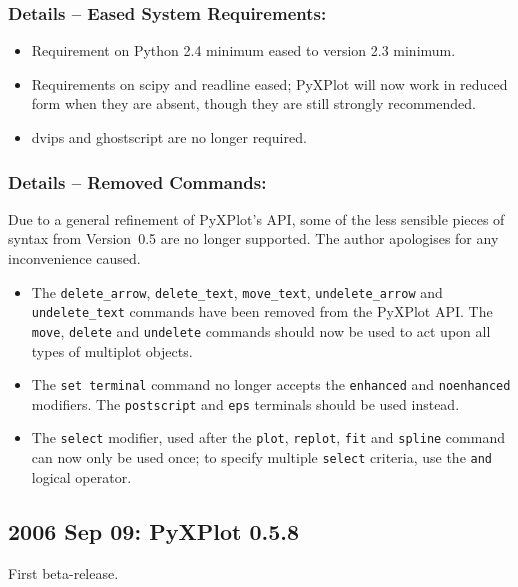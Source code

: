 \subsubsection*{Details -- Eased System Requirements:}

\begin{itemize}
\item Requirement on Python 2.4 minimum eased to version 2.3 minimum.
\item Requirements on scipy and readline eased; PyXPlot will now work in reduced form when they are absent, though they are still strongly recommended.
\item dvips and ghostscript are no longer required.
\end{itemize}

\subsubsection*{Details -- Removed Commands:}

Due to a general refinement of PyXPlot's API, some of the less sensible pieces
of syntax from Version~0.5 are no longer supported. The author apologises for
any inconvenience caused.

\begin{itemize}
\item The {\tt delete\_arrow}, {\tt delete\_text}, {\tt move\_text}, {\tt undelete\_arrow} and {\tt undelete\_text} commands have been removed from the PyXPlot API. The {\tt move}, {\tt delete} and {\tt undelete} commands should now be used to act upon all types of multiplot objects.
\item The {\tt set terminal} command no longer accepts the {\tt enhanced} and {\tt noenhanced} modifiers. The {\tt postscript} and {\tt eps} terminals should be used instead.
\item The {\tt select} modifier, used after the {\tt plot}, {\tt replot}, {\tt fit} and {\tt spline} command can now only be used once; to specify multiple {\tt select} criteria, use the {\tt and} logical operator.
\end{itemize}

\subsection*{2006 Sep 09: PyXPlot 0.5.8}

First beta-release.
